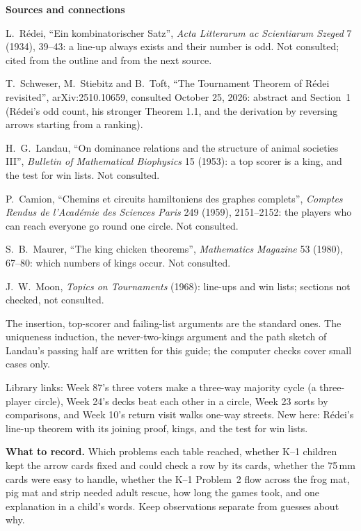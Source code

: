 \documentclass[11pt]{article}
\newcommand{\head}[1]{\par\needspace{6\baselineskip}\vspace{2pt}\textbf{\large #1}\par}
\begin{document}
\head{Sources and connections}
L.~R\'edei, ``Ein kombinatorischer Satz'', \emph{Acta Litterarum ac Scientiarum Szeged} 7 (1934), 39--43: a line-up always exists and their number is odd. Not consulted; cited from the outline and from the next source.\par
T.~Schweser, M.~Stiebitz and B.~Toft, ``The Tournament Theorem of R\'edei revisited'', arXiv:2510.10659, consulted October 25, 2026: abstract and Section~1 (R\'edei's odd count, his stronger Theorem 1.1, and the derivation by reversing arrows starting from a ranking).\par
H.~G.~Landau, ``On dominance relations and the structure of animal societies III'', \emph{Bulletin of Mathematical Biophysics} 15 (1953): a top scorer is a king, and the test for win lists. Not consulted.\par
P.~Camion, ``Chemins et circuits hamiltoniens des graphes complets'', \emph{Comptes Rendus de l'Acad\'emie des Sciences Paris} 249 (1959), 2151--2152: the players who can reach everyone go round one circle. Not consulted.\par
S.~B.~Maurer, ``The king chicken theorems'', \emph{Mathematics Magazine} 53 (1980), 67--80: which numbers of kings occur. Not consulted.\par
J.~W.~Moon, \emph{Topics on Tournaments} (1968): line-ups and win lists; sections not checked, not consulted.\par
The insertion, top-scorer and failing-list arguments are the standard ones. The uniqueness induction, the never-two-kings argument and the path sketch of Landau's passing half are written for this guide; the computer checks cover small cases only.\par
Library links: Week 87's three voters make a three-way majority cycle (a three-player circle), Week 24's decks beat each other in a circle, Week 23 sorts by comparisons, and Week 10's return visit walks one-way streets. New here: R\'edei's line-up theorem with its joining proof, kings, and the test for win lists.

\textbf{What to record.} Which problems each table reached, whether K--1 children kept the arrow cards fixed and could check a row by its cards, whether the 75\,mm cards were easy to handle, whether the K--1 Problem~2 flow across the frog mat, pig mat and strip needed adult rescue, how long the games took, and one explanation in a child's words. Keep observations separate from guesses about why.
\end{document}
